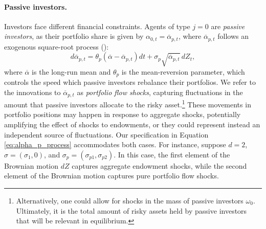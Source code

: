 \paragraph{Passive investors.} Investors face different financial constraints. Agents of type $j = 0 $ are \textit{passive investors}, as their portfolio share is given by $\alpha_{0,t} = \overline{\alpha}_{p,t}$, where $\overline{\alpha}_{p,t}$ follows an exogenous square-root process (\citealp{CIR/1985}):
\begin{equation}\label{eq:alpha_p_process}
    d \overline{\alpha}_{p,t} = \theta_p (\overline{\alpha} - \overline{\alpha}_{p,t}) dt + \sigma_{p} \sqrt{\overline{\alpha}_{p,t}}\, d Z_t,
\end{equation}
where $\overline{\alpha}$ is the long-run mean and $\theta_p$ is the mean-reversion parameter, which controls the speed which passive investors rebalance their portfolios. 
We refer to the innovations to $\overline{\alpha}_{p,t}$ as \textit{portfolio flow shocks}, capturing fluctuations in the amount that passive investors allocate to the risky asset.\footnote{Alternatively, one could allow for shocks in the mass of passive investors $\omega_0$. Ultimately, it is the total amount of risky assets held by passive investors that will be relevant in equilibrium.}
These movements in portfolio positions may happen in response to aggregate shocks, potentially amplifying the effect of shocks to endowments, or they could represent instead an independent source of fluctuations. 
Our specification in Equation \eqref{eq:alpha_p_process} accommodates both cases. 
For instance, suppose $d=2$, $\sigma=\left(\sigma_1,0\right)$, and $\sigma_p=\left(\sigma_{p1},\sigma_{p2}\right)$.
In this case, the first element of the Brownian motion $dZ$ captures aggregate endowment shocks, while the second element of the Brownian motion captures pure portfolio flow shocks. 

